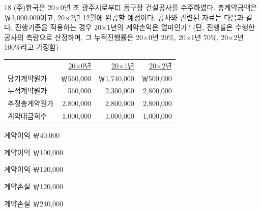 \begin{question}{18}
(주)한국은 20×0년 초 광주시로부터 돔구장 건설공사를 수주하였다. 총계약금액은 ￦3,000,000이고, 20×2년 12월에 완공할 예정이다. 공사와 관련된 자료는 다음과 같다. 진행기준을 적용하는 경우 20×1년의 계약손익은 얼마인가? (단, 진행률은 수행한 공사의 측량으로 산정하며, 그 누적진행률은 20×0년 20\%, 20×1년 70\%, 20×2년 100\%라고 가정함)
\par
{\small\centering
\begin{tabular}{lrrr}
\hline
 & \uline{20×0년} & \uline{20×1년} & \uline{20×2년} \\
당기계약원가 & ￦560,000 & ￦1,740,000 & ￦500,000 \\
누적계약원가 & 560,000 & 2,300,000 & 2,800,000 \\
추정총계약원가 & 2,800,000 & 2,800,000 & 2,800,000 \\
계약대금회수 & 1,000,000 & 1,000,000 & 1,000,000 \\
\hline
\end{tabular}\par}
\begin{choices}
  \item 계약이익 ￦40,000
  \item 계약이익 ￦100,000
  \item 계약이익 ￦120,000
  \item 계약손실 ￦120,000
  \item 계약손실 ￦240,000
\end{choices}
\end{question}
